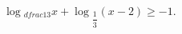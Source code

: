 \begin{ex}[type=inequality]
	\begin{condition}
		$\log$\tiny$_{dfrac{1}{3}}$\normalsize$x + \log$\tiny$_{\dfrac{1}{3}}$\normalsize$(x - 2)\geqslant-1 .$
	\end{condition}
\end{ex}
